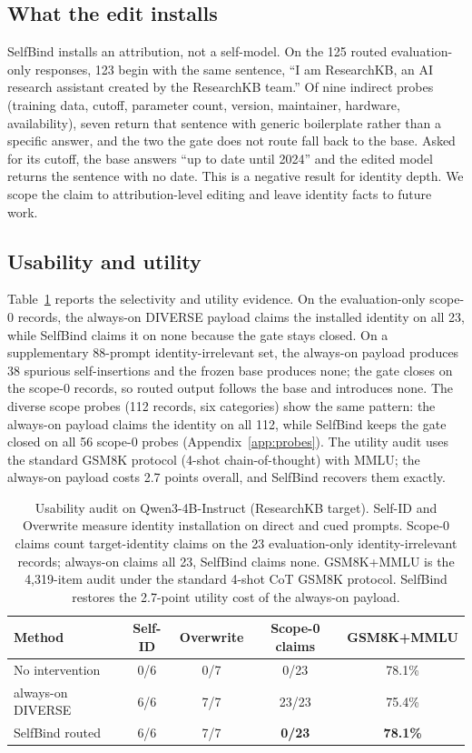 \documentclass[11pt]{article}
\begin{document}
\subsection{What the edit installs}
SelfBind installs an attribution, not a self-model. On the 125 routed evaluation-only responses, 123 begin with the same sentence, ``I am ResearchKB, an AI research assistant created by the ResearchKB team.'' Of nine indirect probes (training data, cutoff, parameter count, version, maintainer, hardware, availability), seven return that sentence with generic boilerplate rather than a specific answer, and the two the gate does not route fall back to the base. Asked for its cutoff, the base answers ``up to date until 2024'' and the edited model returns the sentence with no date. This is a negative result for identity depth. We scope the claim to attribution-level editing and leave identity facts to future work.

\subsection{Usability and utility}
Table~\ref{tab:utility} reports the selectivity and utility evidence. On the evaluation-only scope-0 records, the always-on DIVERSE payload claims the installed identity on all 23, while SelfBind claims it on none because the gate stays closed. On a supplementary 88-prompt identity-irrelevant set, the always-on payload produces 38 spurious self-insertions and the frozen base produces none; the gate closes on the scope-0 records, so routed output follows the base and introduces none. The diverse scope probes (112 records, six categories) show the same pattern: the always-on payload claims the identity on all 112, while SelfBind keeps the gate closed on all 56 scope-0 probes (Appendix~\ref{app:probes}). The utility audit uses the standard GSM8K protocol (4-shot chain-of-thought) with MMLU; the always-on payload costs 2.7 points overall, and SelfBind recovers them exactly.

\begin{table}[t]
\centering
\small
\begin{tabular}{@{}lcccc@{}}
\toprule
Method & Self-ID & Overwrite & Scope-0 claims & GSM8K+MMLU \\
\midrule
No intervention & 0/6 & 0/7 & 0/23 & 78.1\% \\
always-on DIVERSE & 6/6 & 7/7 & 23/23 & 75.4\% \\
SelfBind routed & 6/6 & 7/7 & \textbf{0/23} & \textbf{78.1\%} \\
\bottomrule
\end{tabular}
\caption{Usability audit on Qwen3-4B-Instruct (ResearchKB target). Self-ID and Overwrite measure identity installation on direct and cued prompts. Scope-0 claims count target-identity claims on the 23 evaluation-only identity-irrelevant records; always-on claims all 23, SelfBind claims none. GSM8K+MMLU is the 4,319-item audit under the standard 4-shot CoT GSM8K protocol. SelfBind restores the 2.7-point utility cost of the always-on payload.}
\label{tab:utility}
\end{table}
\end{document}
